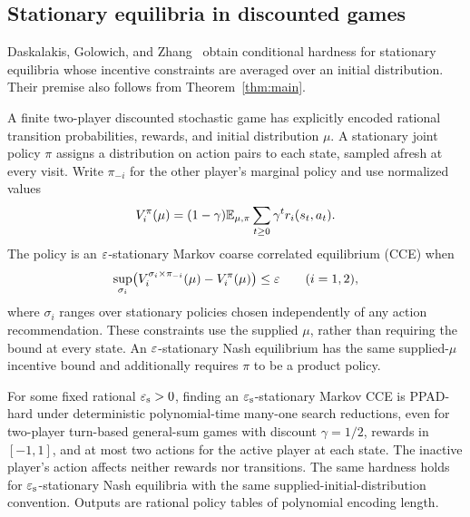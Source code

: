 \subsection{Stationary equilibria in discounted games}

Daskalakis, Golowich, and Zhang~\cite{DGZ2023} obtain conditional
hardness for stationary equilibria whose incentive constraints are
averaged over an initial distribution. Their premise also follows
from Theorem~\ref{thm:main}.

A finite two-player discounted stochastic game has explicitly encoded
rational transition probabilities, rewards, and initial distribution
$\mu$. A stationary joint policy $\pi$ assigns a distribution on action
pairs to each state, sampled afresh at every visit. Write $\pi_{-i}$
for the other player's marginal policy and use normalized values
\[
 V_i^\pi(\mu)=(1-\gamma)\mathbb{E}_{\mu,\pi}
                 \sum_{t\geq0}\gamma^t r_i(s_t,a_t).
\]
The policy is an $\varepsilon$-stationary Markov coarse correlated equilibrium
(CCE) when
\[
 \sup_{\sigma_i}
 \bigl(V_i^{\sigma_i\times\pi_{-i}}(\mu)-V_i^\pi(\mu)\bigr)
 \leq\varepsilon\qquad(i=1,2),
\]
where $\sigma_i$ ranges over stationary policies chosen independently
of any action recommendation. These constraints use the supplied
$\mu$, rather than requiring the bound at every state. An
$\varepsilon$-stationary Nash equilibrium has the same supplied-$\mu$
incentive bound and additionally requires $\pi$ to be a product policy.

\begin{corollary}
\label{cor:stationary-game-hardness}
For some fixed rational $\varepsilon_{\rm s}>0$, finding an
$\varepsilon_{\rm s}$-stationary Markov CCE is PPAD-hard under deterministic
polynomial-time many-one search reductions, even for two-player
turn-based general-sum games with discount $\gamma=1/2$, rewards in
$[-1,1]$, and at most two actions for the active player at each state.
The inactive player's action affects neither rewards nor transitions.
The same hardness holds for $\varepsilon_{\rm s}$-stationary Nash equilibria
with the same supplied-initial-distribution convention. Outputs are
rational policy tables of polynomial encoding length.
\end{corollary}

